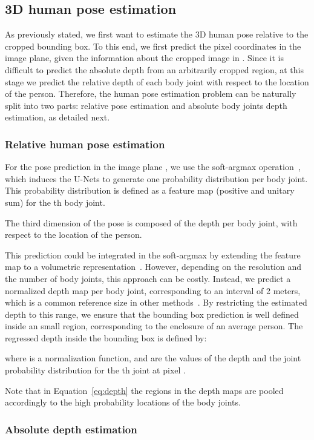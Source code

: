 \documentclass[10pt,twocolumn,letterpaper]{article}
\newcommand{\rev}[1]{#1}
\newcommand{\revb}[1]{{#1}}
\begin{document}
\subsection{3D human pose estimation}

As previously stated, we first want to estimate the 3D human pose
relative to the cropped bounding box. To this end, we first predict the pixel
coordinates  in the image plane, given the information about
the cropped image in . Since it is difficult to predict the absolute depth
from an arbitrarily cropped region, at this stage we predict the relative depth
of each body joint with respect to the location of the person.
Therefore, the human pose estimation problem can be naturally split into
two parts: relative pose estimation and absolute body joints depth estimation,
as detailed next.

\subsubsection{Relative human pose estimation}

For the pose prediction in the image plane , we use the
soft-argmax operation~\cite{LUVIZON201915, Yi_2016}, which induces
the U-Nets to generate one probability distribution per body joint.
This probability distribution
is defined as a feature map 
(positive and unitary sum) for the th body joint.
\rev{
The third dimension of the pose  is composed of the depth per
body joint, with respect to the location of the person.
}
This prediction could be
integrated in the soft-argmax by extending the feature map  to a
volumetric representation~\cite{Sun_2018_ECCV}.  However, depending on the
resolution and the number of body joints, this approach can be costly.
Instead, we predict a normalized \revb{depth map
 per body joint, corresponding to an
interval of 2 meters, which is a common reference size in other methods~\cite{Pavlakos_2017_CVPR}.}
By restricting the estimated depth to this range, we ensure that the bounding
box prediction is well defined inside an small region,
corresponding to the enclosure of an average person.
The regressed depth inside the bounding box is defined by:
\revb{

where  is a normalization function,  and  are the values of the depth and the joint probability distribution for the th joint at pixel .}
Note that in Equation~\ref{eq:depth} \revb{the regions in the depth maps are pooled 
accordingly} to the high probability locations of the body joints.

\subsubsection{Absolute depth estimation}
\end{document}
